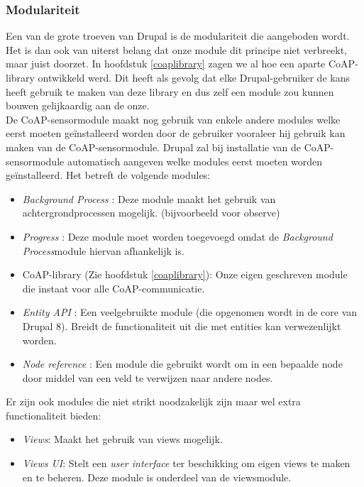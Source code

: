 \subsubsection{Modulariteit}
Een van de grote troeven van Drupal is de modulariteit die aangeboden wordt. Het is dan ook van uiterst belang dat onze module dit principe niet verbreekt, maar juist doorzet. In hoofdstuk \ref{coaplibrary} zagen we al hoe een aparte CoAP-library ontwikkeld werd. Dit heeft als gevolg dat elke Drupal-gebruiker de kans heeft gebruik te maken van deze library en dus zelf een module zou kunnen bouwen gelijkaardig aan de onze.\\
De CoAP-sensormodule maakt nog gebruik van enkele andere modules welke eerst moeten ge\"{i}nstalleerd worden door de gebruiker vooraleer hij gebruik kan maken van de CoAP-sensormodule. Drupal zal bij installatie van de CoAP-sensormodule automatisch aangeven welke modules eerst moeten worden ge\"{i}nstalleerd. Het betreft de volgende modules:
\begin{itemize}
\item \textit{Background Process} \cite{backgroundProcessModule}: Deze module maakt het gebruik van achtergrondprocessen mogelijk. (bijvoorbeeld voor observe)
\item \textit{Progress} \cite{progressModule}: Deze module moet worden toegevoegd omdat de \textit{Background Process}module hiervan afhankelijk is.
\item CoAP-library (Zie hoofdstuk \ref{coaplibrary}): Onze eigen geschreven module die instaat voor alle CoAP-communicatie.
\item \textit{Entity API} \cite{entityApiModule}: Een veelgebruikte module (die opgenomen wordt in de core van Drupal 8). Breidt de functionaliteit uit die met entities kan verwezenlijkt worden.
\item \textit{Node reference} \cite{nodeReferenceModule}: Een module die gebruikt wordt om in een bepaalde node door middel van een veld te verwijzen naar andere nodes.
\end{itemize}

\noindent
Er zijn ook modules die niet strikt noodzakelijk zijn maar wel extra functionaliteit bieden:
\begin{itemize}
\item \textit{Views}\cite{viewsModule}: Maakt het gebruik van views mogelijk.
\item \textit{Views UI}: Stelt een \textit{user interface} ter beschikking om eigen views te maken en te beheren. Deze module is onderdeel van de viewsmodule.
\end{itemize}

